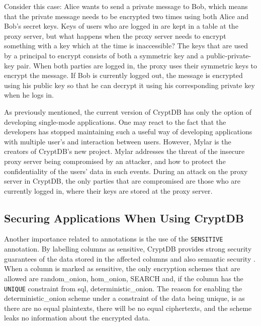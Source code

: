 Consider this case: Alice wants to send a private message to Bob, which means that the private message needs to be encrypted two times using both Alice and Bob's secret keys. Keys of users who are logged in are kept in a table at the proxy server, but what happens when the proxy server needs to encrypt something with a key which at the time is inaccessible? The keys that are used by a principal to encrypt consists of both a symmetric key and a public-private-key pair. When both parties are logged in, the proxy uses their symmetric keys to encrypt the message. If Bob is currently logged out, the message is encrypted using his public key so that he can decrypt it using his corresponding private key when he logs in.

As previously mentioned, the current version of CryptDB has only the option of developing single-mode applications. One may react to the fact that the developers has stopped maintaining such a useful way of developing applications with multiple user's and interaction between users. However, Mylar \cite{mylar_homepage} is the creators of CryptDB's new project. Mylar addresses the threat of the insecure proxy server being compromised by an attacker, and how to protect the confidentiality of the users' data in such events. During an attack on the proxy server in CryptDB, the only parties that are compromised are those who are currently logged in, where their keys are stored at the proxy server.


\subsection{Securing Applications When Using CryptDB}
\label{sec:sensitive}

Another importance related to annotations is the use of the \verb!SENSITIVE! annotation. By labelling columns as sensitive, CryptDB provides strong security guarantees of the data stored in the affected columns and also semantic security \cite{popa_thesis}. When a column is marked as sensitive, the only encryption schemes that are allowed are \gls{random_onion}, \gls{hom_onion}, SEARCH and, if the column has the \verb!UNIQUE! constraint from \gls{sql}, \gls{deterministic_onion}. The reason for enabling the \gls{deterministic_onion} scheme under a constraint of the data being unique, is as there are no equal plaintexts, there will be no equal ciphertexts, and the scheme leaks no information about the encrypted data.


